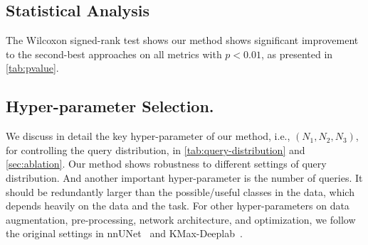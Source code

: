 \documentclass[10pt,twocolumn,letterpaper]{article}
\begin{document}
\subsection{Statistical Analysis}
The Wilcoxon signed-rank test shows our method shows significant improvement to the second-best approaches on all metrics with $p<0.01$, as presented in \cref{tab:pvalue}.
\begin{table}[ht]
    \centering
    \caption{Results of Wilcoxon signed-rank test versus the second-best approaches on all metrics.}
    \label{tab:pvalue}
\end{table}
\subsection{Hyper-parameter Selection.}
We discuss in detail the key hyper-parameter of our method, i.e., $(N_1, N_2, N_3)$, for controlling the query distribution, in \cref{tab:query-distribution} and \cref{sec:ablation}. Our method shows robustness to different settings of query distribution. And another important hyper-parameter is the number of queries. It should be redundantly larger than the possible/useful classes in the data, which depends heavily on the data and the task. For other hyper-parameters on data augmentation, pre-processing, network architecture, and optimization, we follow the original settings in nnUNet~\cite{isensee2021nnu} and KMax-Deeplab~\cite{yu2022k}.
\end{document}
